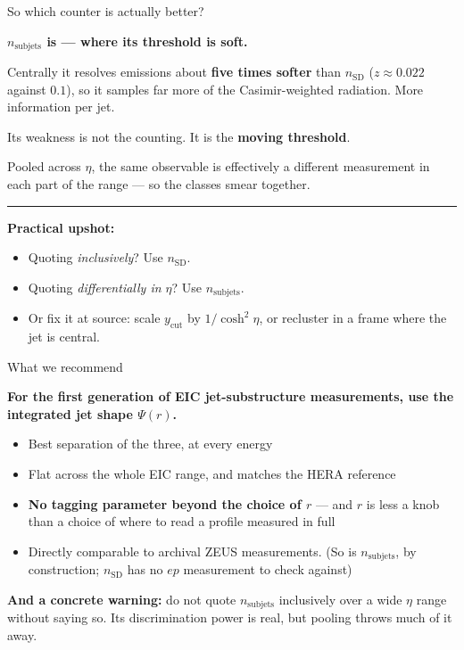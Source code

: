 \documentclass[aspectratio=169,10pt]{beamer}
\begin{document}
\begin{frame}{So which counter is actually better?}

\textbf{$n_{\mathrm{subjets}}$ is --- where its threshold is soft.}

\vspace{0.8em}
Centrally it resolves emissions about \textbf{five times softer} than
$n_{\mathrm{SD}}$ ($z \approx 0.022$ against $0.1$), so it samples far more of
the Casimir-weighted radiation. More information per jet.

\vspace{1.2em}
Its weakness is not the counting. It is the \textbf{moving threshold}.

\vspace{0.8em}
Pooled across $\eta$, the same observable is effectively a different
measurement in each part of the range --- so the classes smear together.

\vspace{1.5em}
\hrule
\vspace{0.8em}
\textbf{Practical upshot:}
\begin{itemize}
  \item Quoting \emph{inclusively}? Use $n_{\mathrm{SD}}$.
  \item Quoting \emph{differentially in $\eta$}? Use $n_{\mathrm{subjets}}$.
  \item Or fix it at source: scale $y_{\mathrm{cut}}$ by $1/\cosh^2\eta$,
        or recluster in a frame where the jet is central.
\end{itemize}

\end{frame}

\begin{frame}{What we recommend}

\textbf{For the first generation of EIC jet-substructure measurements, use the
integrated jet shape $\Psi(r)$.}

\vspace{1em}
\begin{itemize}
  \item Best separation of the three, at every energy
  \item Flat across the whole EIC range, and matches the HERA reference
  \item \textbf{No tagging parameter beyond the choice of $r$} --- and $r$ is
        less a knob than a choice of where to read a profile measured in full
  \item Directly comparable to archival ZEUS measurements. (So is
        $n_{\mathrm{subjets}}$, by construction; $n_{\mathrm{SD}}$ has no $ep$
        measurement to check against)
\end{itemize}

\vspace{1.2em}
\textbf{And a concrete warning:} do not quote $n_{\mathrm{subjets}}$
inclusively over a wide $\eta$ range without saying so. Its discrimination
power is real, but pooling throws much of it away.

\end{frame}
\end{document}
